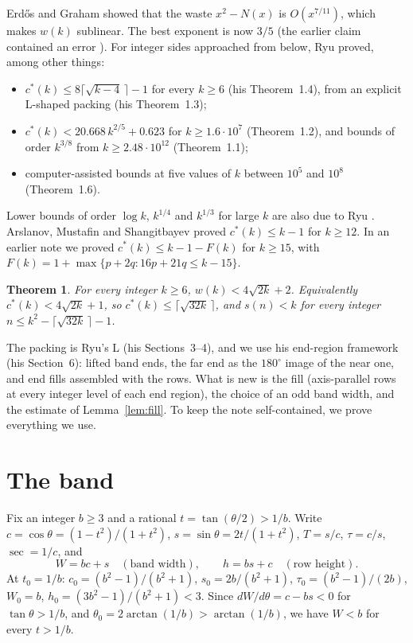 \documentclass[11pt,letterpaper]{amsart}
\theoremstyle{plain}
\newtheorem{theorem}{Theorem}
\theoremstyle{remark}
\newcommand{\cs}{c^{*}}
\begin{document}
Erd\H{o}s and Graham \cite{EG75} showed that the waste $x^2-N(x)$ is $O(x^{7/11})$, which makes $w(k)$ sublinear. The best exponent is now $3/5$ \cite{Bui25,McC26} (the earlier claim \cite{CG20} contained an error \cite{AB26}). For integer sides approached from below, Ryu \cite{Ryu26} proved, among other things:
\begin{itemize}
\item $\cs(k)\le 8\lceil\sqrt{k-4}\,\rceil-1$ for every $k\ge6$ (his Theorem~1.4), from an explicit L-shaped packing (his Theorem~1.3);
\item $\cs(k)<20.668\,k^{2/5}+0.623$ for $k\ge1.6\cdot10^{7}$ (Theorem~1.2), and bounds of order $k^{3/8}$ from $k\ge2.48\cdot10^{12}$ (Theorem~1.1);
\item computer-assisted bounds at five values of $k$ between $10^5$ and $10^8$ (Theorem~1.6).
\end{itemize}
Lower bounds of order $\log k$, $k^{1/4}$ and $k^{1/3}$ for large $k$ are also due to Ryu \cite{Ryu26b}. Arslanov, Mustafin and Shangitbayev \cite{AMS21} proved $\cs(k)\le k-1$ for $k\ge12$. In an earlier note \cite{Fan26a} we proved $\cs(k)\le k-1-F(k)$ for $k\ge15$, with $F(k)=1+\max\{p+2q:16p+21q\le k-15\}$.

\begin{theorem}\label{thm:A}
For every integer $k\ge6$, $w(k)<4\sqrt{2k}+2$. Equivalently $\cs(k)<4\sqrt{2k}+1$, so $\cs(k)\le\lceil\sqrt{32k}\,\rceil$, and $s(n)<k$ for every integer $n\le k^2-\lceil\sqrt{32k}\,\rceil-1$.
\end{theorem}

The packing is Ryu's L (his Sections~3--4), and we use his end-region framework (his Section~6): lifted band ends, the far end as the $180^\circ$ image of the near one, and end fills assembled with the rows. What is new is the fill (axis-parallel rows at every integer level of each end region), the choice of an odd band width, and the estimate of Lemma~\ref{lem:fill}. To keep the note self-contained, we prove everything we use.

\section{The band}\label{sec:band}

Fix an integer $b\ge3$ and a rational $t=\tan(\theta/2)>1/b$. Write $c=\cos\theta=(1-t^2)/(1+t^2)$, $s=\sin\theta=2t/(1+t^2)$, $T=s/c$, $\tau=c/s$, $\sec=1/c$, and
\[
W=bc+s\quad(\text{band width}),\qquad h=bs+c\quad(\text{row height}).
\]
At $t_0=1/b$: $c_0=(b^2-1)/(b^2+1)$, $s_0=2b/(b^2+1)$, $\tau_0=(b^2-1)/(2b)$, $W_0=b$, $h_0=(3b^2-1)/(b^2+1)<3$. Since $dW/d\theta=c-bs<0$ for $\tan\theta>1/b$, and $\theta_0=2\arctan(1/b)>\arctan(1/b)$, we have $W<b$ for every $t>1/b$.
\end{document}

